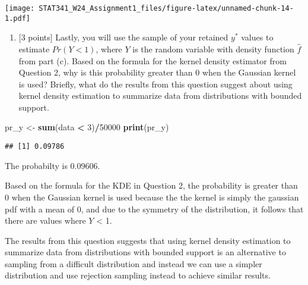 \documentclass[
]{article}
\newenvironment{Shaded}{\begin{snugshade}}{\end{snugshade}}
\newcommand{\DecValTok}[1]{\textcolor[rgb]{0.00,0.00,0.81}{#1}}
\newcommand{\FunctionTok}[1]{\textcolor[rgb]{0.13,0.29,0.53}{\textbf{#1}}}
\newcommand{\NormalTok}[1]{#1}
\newcommand{\OtherTok}[1]{\textcolor[rgb]{0.56,0.35,0.01}{#1}}
\newcommand{\SpecialCharTok}[1]{\textcolor[rgb]{0.81,0.36,0.00}{\textbf{#1}}}
\providecommand{\tightlist}{%
  \setlength{\itemsep}{0pt}\setlength{\parskip}{0pt}}
\begin{document}
\texttt{[image: STAT341\_W24\_Assignment1\_files/figure-latex/unnamed-chunk-14-1.pdf]}

\begin{enumerate}
\def\labelenumi{(\alph{enumi})}
\setcounter{enumi}{6}
\tightlist
\item
  {[}3 points{]} Lastly, you will use the sample of your retained
  \(y^*\) values to estimate \(Pr(Y < 1)\), where \(Y\) is the random
  variable with density function \(\hat{f}\) from part (c). Based on the
  formula for the kernel density estimator from Question 2, why is this
  probability greater than 0 when the Gaussian kernel is used? Briefly,
  what do the results from this question suggest about using kernel
  density estimation to summarize data from distributions with bounded
  support.
\end{enumerate}

\begin{Shaded}
\begin{Highlighting}[]
\NormalTok{pr\_y }\OtherTok{\textless{}{-}} \FunctionTok{sum}\NormalTok{(data }\SpecialCharTok{\textless{}} \DecValTok{3}\NormalTok{)}\SpecialCharTok{/}\DecValTok{50000}
\FunctionTok{print}\NormalTok{(pr\_y)}
\end{Highlighting}
\end{Shaded}

\begin{verbatim}
## [1] 0.09786
\end{verbatim}

The probabilty is 0.09606.

Based on the formula for the KDE in Question 2, the probability is
greater than 0 when the Gaussian kernel is used because the the kernel
is simply the gaussian pdf with a mean of 0, and due to the symmetry of
the distribution, it follows that there are values where \(Y\)
\textless{} 1.

The results from this question suggests that using kernel density
estimation to summarize data from distributions with bounded support is
an alternative to sampling from a difficult distribution and instead we
can use a simpler distribution and use rejection sampling instead to
achieve similar results.
\end{document}
